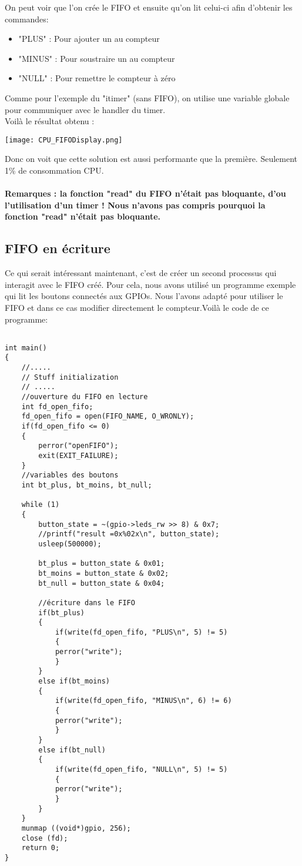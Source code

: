 \newpage On peut voir que l'on crée le FIFO et ensuite qu'on lit celui-ci afin d'obtenir les commandes:
\begin{itemize}
\item "PLUS" : Pour ajouter un au compteur
\item "MINUS" : Pour soustraire un au compteur
\item "NULL" : Pour remettre le compteur à zéro\\
\end{itemize}

Comme pour l'exemple du "itimer" (sans FIFO), on utilise une variable globale pour communiquer avec le handler du timer.\\

Voilà le résultat obtenu :
\begin{center} 
\hspace{12.45cm}
\texttt{[image: CPU\_FIFODisplay.png]}
\end{center}
\vspace{1cm}

Donc on voit que cette solution est aussi performante que la première. Seulement 1\% de consommation CPU.\\\\

\textbf{Remarques : la fonction "read" du FIFO n'était pas bloquante, d'ou l'utilisation d'un timer ! Nous n'avons pas compris pourquoi la fonction "read" n'était pas bloquante.}

\newpage\subsection{FIFO en écriture}
Ce qui serait intéressant maintenant, c'est de créer un second processus qui interagit avec le FIFO créé. Pour cela, nous avons utilisé un programme exemple qui lit les boutons connectés aux GPIOs. Nous l'avons adapté pour utiliser le FIFO et dans ce cas modifier directement le compteur.Voilà le code de ce programme:

\begin{lstlisting}[frame=single,style=C]  % Start your code-block

int main()
{
	//.....
	// Stuff initialization
	// .....
	//ouverture du FIFO en lecture
	int fd_open_fifo;
	fd_open_fifo = open(FIFO_NAME, O_WRONLY);
	if(fd_open_fifo <= 0)
	{
		perror("openFIFO");
		exit(EXIT_FAILURE);
	}
	//variables des boutons
	int bt_plus, bt_moins, bt_null;
	
	while (1)
	{
		button_state = ~(gpio->leds_rw >> 8) & 0x7;
		//printf("result =0x%02x\n", button_state);
		usleep(500000);

		bt_plus = button_state & 0x01;
		bt_moins = button_state & 0x02;
		bt_null = button_state & 0x04;

		//écriture dans le FIFO
		if(bt_plus)
		{
			if(write(fd_open_fifo, "PLUS\n", 5) != 5)
			{
			perror("write"); 
			}
		}
		else if(bt_moins)
		{
			if(write(fd_open_fifo, "MINUS\n", 6) != 6)
			{
			perror("write"); 
			}
		}
		else if(bt_null)
		{
			if(write(fd_open_fifo, "NULL\n", 5) != 5)
			{
			perror("write"); 
			}
		}
	}
	munmap ((void*)gpio, 256);
	close (fd);
	return 0;
}
\end{lstlisting}

